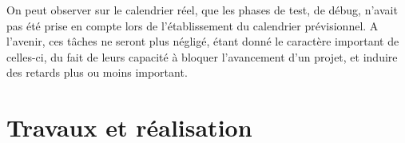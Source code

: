 \documentclass[french,a4paper,12pt]{report}
\begin{document}
	On peut observer sur le calendrier réel, que les phases de test, de débug, n'avait pas été prise en compte lors de l'établissement du calendrier prévisionnel.
	A l'avenir, ces tâches ne seront plus négligé, étant donné le caractère important de celles-ci, du fait de leurs capacité à bloquer l'avancement d'un projet, et induire des retards plus ou moins important.
	
	
	
%
%
	
	\part{Travaux et réalisation}
	
	
	
\end{document}

